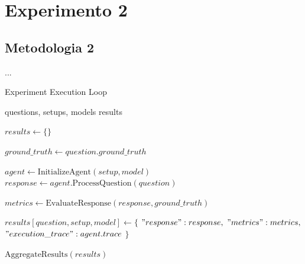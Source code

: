 
\chapter{Experimento 2}
    

    \section{Metodologia 2}
        
        ...

        \begin{algorithm}
            \caption{Experiment Execution Loop}
            \begin{algorithmic}[1]
            \Require questions, setups, models
            \Ensure results
            
                \State $results \gets \{\}$
                
                    \State $ground\_truth \gets question.ground\_truth$
                    
                            \State $agent \gets \text{InitializeAgent}(setup, model)$
                            \State $response \gets agent.\text{ProcessQuestion}(question)$
                            
                            \State $metrics \gets \text{EvaluateResponse}(response, ground\_truth)$
                            
                            \State $results[question, setup, model] \gets \{$
                            \State \hspace{1cm} $"response": response,$
                            \State \hspace{1cm} $"metrics": metrics,$
                            \State \hspace{1cm} $"execution\_trace": agent.trace$
                            \State $\}$
                        \EndFor
                    \EndFor
                \EndFor
                
                \State \Return $\text{AggregateResults}(results)$
            \EndFunction
            
            \end{algorithmic}
        \end{algorithm}
            
